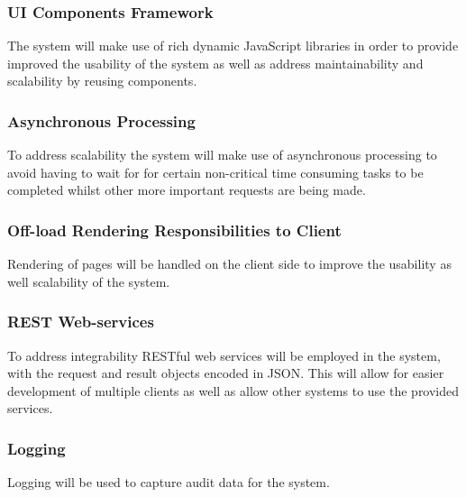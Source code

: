 \subsubsection{UI Components Framework}
	The system will make use of rich dynamic JavaScript libraries in order to provide improved the usability of the system as well as address maintainability and scalability by reusing components.
\subsubsection{Asynchronous Processing}
	To address scalability the system will make use of asynchronous processing to avoid having to wait for for certain non-critical time consuming tasks to be completed whilst other more important requests are being made.
\subsubsection{Off-load Rendering Responsibilities to Client}
	Rendering of pages will be handled on the client side to improve the usability as well scalability of the system.
\subsubsection{REST Web-services}
	To address integrability RESTful web services will be employed in the system, with the request and result objects encoded in JSON. This will allow for easier development of multiple clients as well as allow other systems to use the provided services.
\subsubsection{Logging}
	Logging will be used to capture audit data for the system.